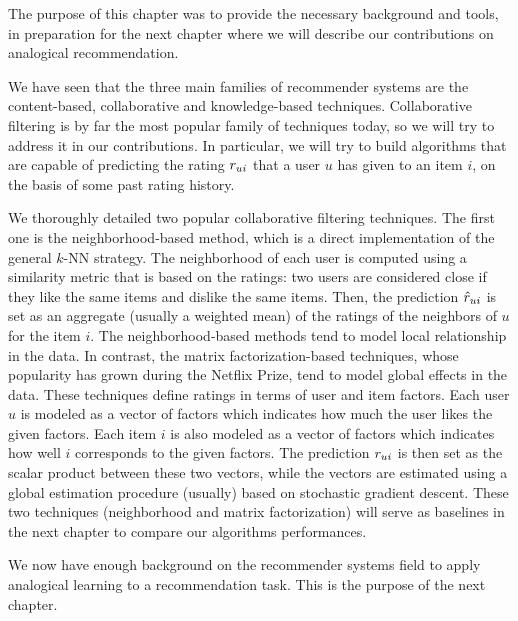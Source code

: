 The purpose of this chapter was to provide the necessary background and tools,
in preparation for the next chapter where we will describe our contributions on
analogical recommendation.

We have seen that the three main families of recommender systems are the
content-based, collaborative and knowledge-based techniques. Collaborative
filtering is by far the most popular family of techniques today, so we will try
to address it in our contributions. In particular, we will try to
build algorithms that are capable of predicting the rating $r_{ui}$ that a user
$u$ has given to an item $i$, on the basis of some past rating history.

We thoroughly detailed two popular collaborative filtering techniques. The
first one is the neighborhood-based method, which is a direct implementation of
the general $k$-NN strategy. The neighborhood of each user is computed using a
similarity metric that is based  on the ratings: two users are considered close
if they like the same items and dislike the same items. Then, the prediction
$\hat{r}_{ui}$ is set as an aggregate (usually a weighted mean) of the ratings of
the neighbors of $u$ for the item $i$. The neighborhood-based methods tend to
model local relationship in the data. In contrast, the matrix
factorization-based techniques, whose popularity has grown during the Netflix
Prize, tend to model global effects in the data. These techniques define ratings
in terms of user and item factors. Each user $u$ is modeled as a vector of
factors which indicates how much the user likes the given factors.
Each item $i$ is also modeled as a vector of factors which indicates how well
$i$ corresponds to the given factors. The prediction $r_{ui}$ is then set as the
scalar product between these two vectors, while the vectors are estimated using
a global estimation procedure (usually) based on stochastic gradient descent.
These two techniques (neighborhood and matrix factorization) will serve as
baselines in the next chapter to compare our algorithms performances.

We now have enough background on the recommender systems field to apply
analogical learning to a recommendation task. This is the purpose of the next
chapter.
